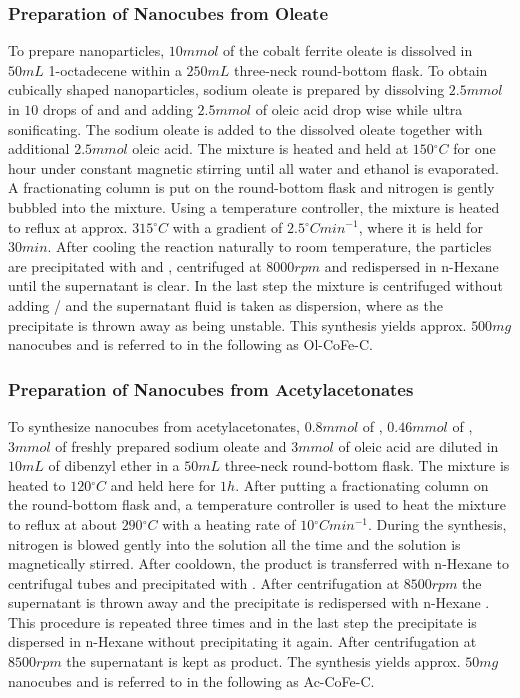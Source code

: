 \documentclass[\main/dresen_thesis.tex]{subfiles}
\begin{document}
    \subsubsection{Preparation of Nanocubes from Oleate}
      To prepare nanoparticles, $10 \unit{mmol}$ of the cobalt ferrite oleate is dissolved in $50 \unit{mL}$ 1-octadecene within a $250 \unit{mL}$ three-neck round-bottom flask.
      To obtain cubically shaped nanoparticles, sodium oleate is prepared by dissolving $2.5 \unit{mmol}$  in $10$ drops of  and  and adding $2.5 \unit{mmol}$ of oleic acid drop wise while ultra sonificating.
      The sodium oleate is added to the dissolved oleate together with additional $2.5 \unit{mmol}$ oleic acid.
      The mixture is heated and held at $150 \unit{^\circ C}$ for one hour under constant magnetic stirring until all water and ethanol is evaporated.
      A fractionating column is put on the round-bottom flask and nitrogen is gently bubbled into the mixture.
      Using a temperature controller, the mixture is heated to reflux at approx. $315 \unit{^\circ C}$ with a gradient of $2.5 \unit{^\circ C min^{-1}}$, where it is held for $30 \unit{min}$.
      After cooling the reaction naturally to room temperature, the particles are precipitated with  and , centrifuged at $8000 \unit{rpm}$ and redispersed in n-Hexane until the supernatant is clear.
      In the last step the mixture is centrifuged without adding / and the supernatant fluid is taken as dispersion, where as the precipitate is thrown away as being unstable.
      This synthesis yields approx. $500 \unit{mg}$ nanocubes and is referred to in the following as Ol-CoFe-C.


    \subsubsection{Preparation of Nanocubes from Acetylacetonates}
      To synthesize nanocubes from acetylacetonates, $0.8 \unit{mmol}$ of , $0.46 \unit{mmol}$ of , $3 \unit{mmol}$ of freshly prepared sodium oleate and $3 \unit{mmol}$ of oleic acid are diluted in $10 \unit{mL}$ of dibenzyl ether in a $50 \unit{mL}$ three-neck round-bottom flask.
      The mixture is heated to $120 \unit{^\circ C}$ and held here for $1 \unit{h}$.
      After putting a fractionating column on the round-bottom flask and, a temperature controller is used to heat the mixture to reflux at about $290 \unit{^\circ C}$ with a heating rate of $10 \unit{^\circ C min^{-1}}$.
      During the synthesis, nitrogen is blowed gently into the solution all the time and the solution is magnetically stirred.
      After cooldown, the product is transferred with n-Hexane to centrifugal tubes and precipitated with .
      After centrifugation at $8500 \unit{rpm}$ the supernatant is thrown away and the precipitate is redispersed with n-Hexane .
      This procedure is repeated three times and in the last step the precipitate is dispersed in n-Hexane without precipitating it again.
      After centrifugation at $8500 \unit{rpm}$ the supernatant is kept as product.
      The synthesis yields approx. $50 \unit{mg}$ nanocubes and is referred to in the following as Ac-CoFe-C.
\end{document}

